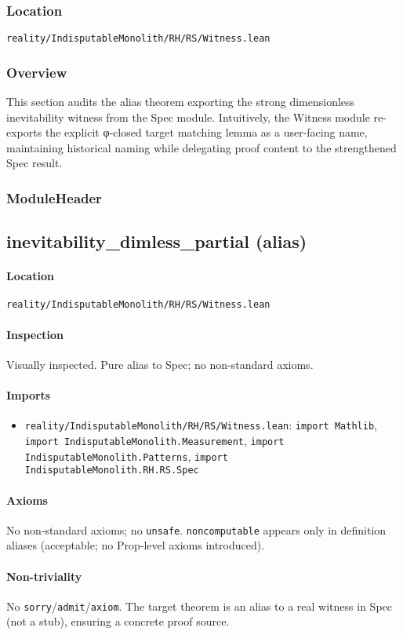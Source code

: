 \documentclass{article}
\newcommand{\FileRef}[1]{\texttt{#1}}
\newcommand{\ModuleHeader}[3]{%
  \subsection{#1}
  \paragraph{Location} \FileRef{#2}\\
  \paragraph{Inspection} #3
}
\begin{document}
\subsubsection{Location}
\FileRef{reality/IndisputableMonolith/RH/RS/Witness.lean}

\subsubsection{Overview}
This section audits the alias theorem exporting the strong dimensionless inevitability witness from the Spec module. Intuitively, the Witness module re-exports the explicit φ‑closed target matching lemma as a user-facing name, maintaining historical naming while delegating proof content to the strengthened Spec result.

\subsubsection{ModuleHeader}
\ModuleHeader{inevitability\_dimless\_partial (alias)}{reality/IndisputableMonolith/RH/RS/Witness.lean}{Visually inspected. Pure alias to Spec; no non‑standard axioms.}

\paragraph{Imports}
\begin{itemize}[leftmargin=*]
  \item \FileRef{reality/IndisputableMonolith/RH/RS/Witness.lean}: \texttt{import Mathlib}, \texttt{import IndisputableMonolith.Measurement}, \texttt{import IndisputableMonolith.Patterns}, \texttt{import IndisputableMonolith.RH.RS.Spec}
\end{itemize}

\paragraph{Axioms}
No non‑standard axioms; no \texttt{unsafe}. \texttt{noncomputable} appears only in definition aliases (acceptable; no Prop‑level axioms introduced).

\paragraph{Non-triviality}
No \texttt{sorry}/\texttt{admit}/\texttt{axiom}. The target theorem is an alias to a real witness in Spec (not a stub), ensuring a concrete proof source.
\end{document}

